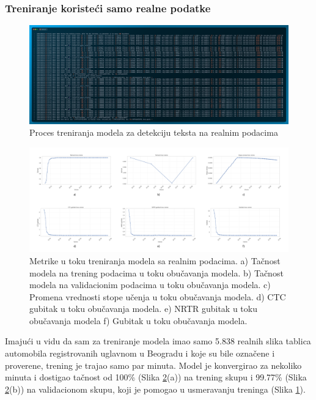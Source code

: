 \documentclass[a4paper,12pt]{article}
\begin{document}
	\subsubsection{Treniranje koristeći samo realne podatke}
	\begin{figure}[H]
		\centering
		\includegraphics[width=\textwidth]{assets/train-code-real-data.png}
		\caption{Proces treniranja modela za detekciju teksta na realnim podacima}
		\label{fig:train-code-real-data}
	\end{figure}

	\begin{figure}[H]
		\centering
		\includegraphics[width=\textwidth]{assets/real-data-metrics.png}
		\caption{Metrike u toku treniranja modela sa realnim podacima. a) Tačnost modela na trening podacima u toku obučavanja modela. b) Tačnost modela na validacionim podacima u toku obučavanja modela. c) Promena vrednosti stope učenja u toku obučavanja modela. d) CTC gubitak u toku obučavanja modela. e) NRTR gubitak u toku obučavanja modela f) Gubitak u toku obučavanja modela.}
		\label{fig:real-data-metrics}
	\end{figure}
	
	Imajući u vidu da sam za treniranje modela imao samo 5.838 realnih slika tablica automobila registrovanih uglavnom u Beogradu i koje su bile označene i proverene, trening je trajao samo par minuta. Model je konvergirao za nekoliko minuta i dostigao tačnost od 100\% (Slika \ref{fig:real-data-metrics}(a)) na trening skupu i 99.77\% (Slika \ref{fig:real-data-metrics}(b)) na validacionom skupu, koji je pomogao u usmeravanju treninga (Slika \ref{fig:train-code-real-data}).\newline
	
\end{document}
